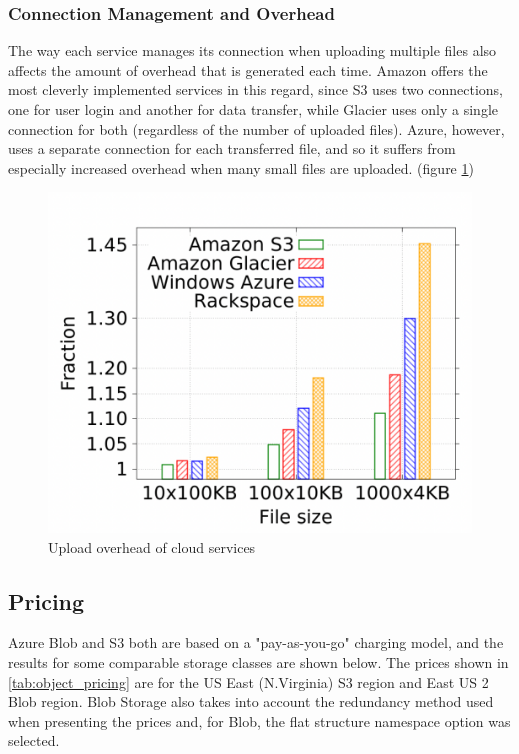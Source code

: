 \subsubsection{Connection Management and Overhead}
The way each service manages its connection when uploading multiple files also affects the amount of overhead that is generated each time. Amazon offers the most cleverly implemented services in this regard, since S3 uses two connections, one for user login and another for data transfer, while Glacier uses only a single connection for both (regardless of the number of uploaded files). Azure, however, uses a separate connection for each transferred file, and so it suffers from especially increased overhead when many small files are uploaded. (figure \ref{fig:overhead})

\begin{figure} [h]
    \centering
    \includegraphics[scale=0.3]{images/overhead}
    \caption{\label{fig:overhead}Upload overhead of cloud services}
\end{figure}

\subsection{Pricing}
Azure Blob and S3 both are based on a "pay-as-you-go" charging model,  and the results for some comparable storage classes are shown below. The prices shown in \ref{tab:object_pricing} are for the US East (N.Virginia) S3 region and East US 2 Blob region. Blob Storage also takes into account the redundancy method used when presenting the prices and, for Blob, the flat structure namespace option was selected. ~\cite{s3_pricing,blob_pricing}

